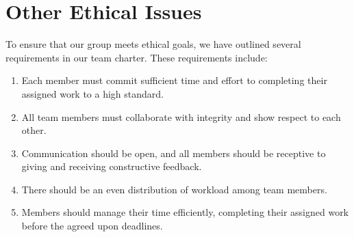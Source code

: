 \section{Other Ethical Issues}


To ensure that our group meets ethical goals, we have outlined several requirements in our team charter. These requirements include:

\begin{enumerate}
  \item Each member must commit sufficient time and effort to completing their assigned work to a high standard. 
  \item All team members must collaborate with integrity and show respect to each other.
  \item Communication should be open, and all members should be receptive to giving and receiving constructive feedback.
  \item There should be an even distribution of workload among team members.
  \item Members should manage their time efficiently, completing their assigned work before the agreed upon deadlines.
\end{enumerate}
 







